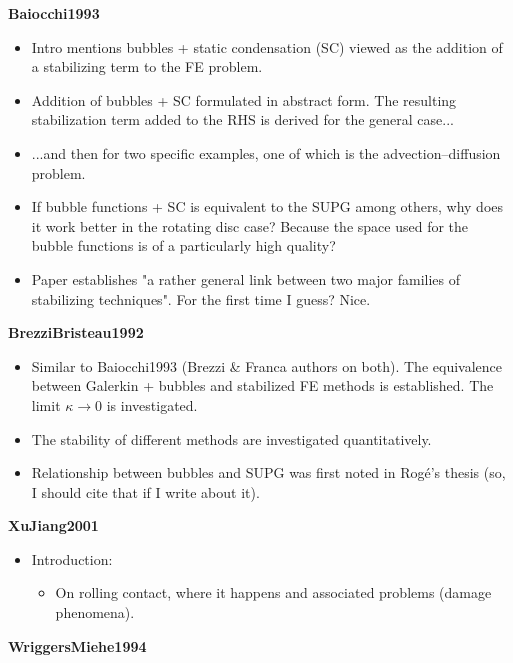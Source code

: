 \documentclass{article}
\begin{document}
\textbf{Baiocchi1993}
\begin{itemize}
\item Intro mentions bubbles + static condensation (SC) viewed as the addition of a stabilizing term to the FE problem.
\item Addition of bubbles + SC formulated in abstract form. The resulting stabilization term added to the RHS is derived for the general case...
\item ...and then for two specific examples, one of which is the advection--diffusion problem.
\item If bubble functions + SC is equivalent to the SUPG among others, why does it work better in the rotating disc case? Because the space used for the bubble functions is of a particularly high quality?
\item Paper establishes "a rather general link between two major families of stabilizing techniques". For the first time I guess? Nice.
\end{itemize}

\textbf{BrezziBristeau1992}
\begin{itemize}
\item Similar to Baiocchi1993 (Brezzi \& Franca authors on both). The equivalence between Galerkin + bubbles and stabilized FE methods is established. The limit $\kappa \rightarrow 0$ is investigated.
\item The stability of different methods are investigated quantitatively.
\item Relationship between bubbles and SUPG was first noted in Rogé's thesis (so, I should cite that if I write about it).
\end{itemize}

\textbf{XuJiang2001}
\begin{itemize}
\item Introduction:
\begin{itemize}
\item On rolling contact, where it happens and associated problems (damage phenomena).
\end{itemize}
\end{itemize}







\textbf{WriggersMiehe1994}
\end{document}
